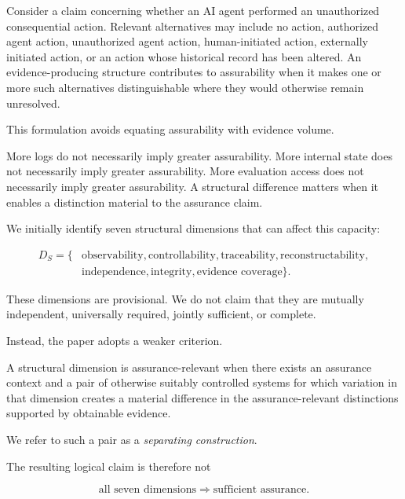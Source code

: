 Consider a claim concerning whether an AI agent performed an unauthorized consequential action.
Relevant alternatives may include no action, authorized agent action, unauthorized agent action,
human-initiated action, externally initiated action, or an action whose historical record has been altered.
An evidence-producing structure contributes to assurability
when it makes one or more such alternatives distinguishable where they would otherwise remain unresolved.

This formulation avoids equating assurability with evidence volume.

More logs do not necessarily imply greater assurability.
More internal state does not necessarily imply greater assurability.
More evaluation access does not necessarily imply greater assurability.
A structural difference matters when it enables a distinction material to the assurance claim.

We initially identify seven structural dimensions that can affect this capacity:

\begin{equation}
  \begin{aligned}
    D_S = \{ &
    \text{observability},
    \text{controllability},
    \text{traceability},
    \text{reconstructability}, \\
             &
    \text{independence},
    \text{integrity},
    \text{evidence coverage}
    \}.
  \end{aligned}
\end{equation}

These dimensions are provisional.
We do not claim that they are mutually independent,
universally required, jointly sufficient, or complete.

Instead, the paper adopts a weaker criterion.

A structural dimension is assurance-relevant when there exists an assurance context
and a pair of otherwise suitably controlled systems for which variation in that dimension creates a material difference
in the assurance-relevant distinctions supported by obtainable evidence.

We refer to such a pair as a \emph{separating construction}.

The resulting logical claim is therefore not

\begin{equation}
  \text{all seven dimensions}
  \Rightarrow
  \text{sufficient assurance}.
\end{equation}

